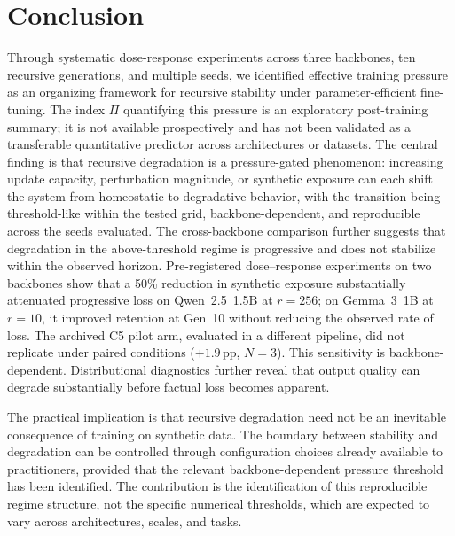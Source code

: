 \documentclass[a4paper,fleqn]{cas-dc}
\newif\ifshowchanges
\newcommand{\rev}[1]{\ifshowchanges{\color{blue}#1}\else{#1}\fi}
\begin{document}
\FloatBarrier
\section{Conclusion}\label{sec:conclusion}

Through systematic dose-response experiments across three backbones, ten
recursive generations, and multiple seeds, we identified effective training
pressure as an organizing framework for recursive stability under
parameter-efficient fine-tuning. \rev{The index $\Pi$ quantifying this pressure is an
exploratory post-training summary; it is not available prospectively and has
not been validated as a transferable quantitative predictor across
architectures or datasets.} The central finding is that recursive
degradation is a pressure-gated phenomenon: increasing update capacity,
perturbation magnitude, or synthetic exposure \rev{can each shift} the system from homeostatic to degradative behavior, with the transition being
\rev{threshold-like within the tested grid}, backbone-dependent, and reproducible across the seeds evaluated. \rev{The cross-backbone comparison further suggests} that degradation in the above-threshold regime is progressive and does not
stabilize within the observed horizon. \rev{Pre-registered dose--response
experiments on two backbones show that a 50\% reduction in synthetic exposure
\rev{substantially} attenuated progressive loss on \rev{Qwen~2.5~1.5B at $r=256$}; on \rev{Gemma~3~1B at $r=10$}, it improved
retention at Gen~10 without reducing the observed rate of loss. The archived C5 pilot arm, evaluated in a
different pipeline, did not replicate under paired conditions ($+1.9$\,pp,
$N=3$).} This sensitivity is backbone-dependent. Distributional diagnostics further reveal
that output quality can degrade substantially before factual loss becomes
apparent.

The practical implication is that recursive degradation need not be an
inevitable consequence of training on synthetic data. The boundary between
stability and degradation can be controlled through configuration choices
already available to practitioners, provided that the relevant
backbone-dependent pressure threshold has been identified. The contribution is
the identification of this reproducible regime structure, not the specific
numerical thresholds, which are expected to vary across architectures, scales,
and tasks.
\end{document}

